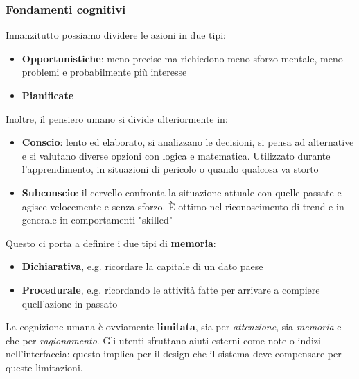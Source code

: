 \subsubsection{Fondamenti cognitivi}
Innanzitutto possiamo dividere le azioni in due tipi:
\begin{itemize}
	\item \textbf{Opportunistiche}: meno precise ma richiedono meno sforzo mentale, meno problemi e probabilmente più interesse
	\item \textbf{Pianificate}
\end{itemize}
Inoltre, il pensiero umano si divide ulteriormente in:
\begin{itemize}
	\item \textbf{Conscio}: lento ed elaborato, si analizzano le decisioni, si pensa ad alternative e si valutano diverse opzioni con logica e matematica. Utilizzato durante l'apprendimento, in situazioni di pericolo o quando qualcosa va storto
	\item \textbf{Subconscio}: il cervello confronta la situazione attuale con quelle passate e agisce velocemente e senza sforzo. È ottimo nel riconoscimento di trend e in generale in comportamenti "skilled" 
\end{itemize}
Questo ci porta a definire i due tipi di \textbf{memoria}:
\begin{itemize}
	\item \textbf{Dichiarativa}, e.g. ricordare la capitale di un dato paese
	\item \textbf{Procedurale}, e.g. ricordando le attività fatte per arrivare a compiere quell'azione in passato
\end{itemize}
La cognizione umana è ovviamente \textbf{limitata}, sia per \textit{attenzione}, sia \textit{memoria} e che per \textit{ragionamento}. Gli utenti sfruttano aiuti esterni come note o indizi nell'interfaccia: questo implica per il design che il sistema deve compensare per queste limitazioni.

